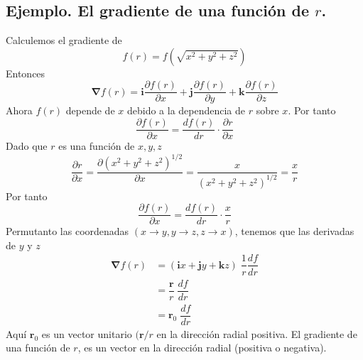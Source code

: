 \subsection*{Ejemplo. El gradiente de una función de $r$.}
Calculemos el gradiente de
\[ f(r) = f(\sqrt{x^{2} + y^{2} + z^{2}}) \]
Entonces
\[ \bm{\nabla} f(r) = \mathbf{i} \dfrac{\partial f(r)}{\partial x} + \mathbf{j} \dfrac{\partial f(r)}{\partial y} + \mathbf{k} \dfrac{\partial f(r)}{\partial z} \]
Ahora $f(r)$ depende de $x$ debido a la dependencia de $r$ sobre $x$. Por tanto
\[ \dfrac{\partial f(r)}{\partial x} = \dfrac{df(r)}{dr} \cdot \dfrac{\partial r}{\partial x} \]
Dado que $r$ es una función de $x,y,z$
\[ \dfrac{\partial r}{\partial x} = \dfrac{\partial (x^{2} + y^{2} + z^{2})^{1/2} }{\partial x} = \dfrac{x}{(x^{2} + y^{2} + z^{2})^{1/2}} = \dfrac{x}{r} \]
Por tanto
\[ \dfrac{\partial f(r)}{\partial x} = \dfrac{d f(r)}{d r} \cdot \dfrac{x}{r} \]
Permutanto las coordenadas $(x \to y, y \to z, z \to x)$, tenemos que las derivadas de $y$ y $z$
\[ \begin{split}  \bm{\nabla} f(r) &= ( \mathbf{i} x + \mathbf{j} y + \mathbf{k} z) \; \dfrac{1}{r} \dfrac{df}{dr} \\
&= \dfrac{\mathbf{r}}{r} \; \dfrac{df}{dr} \\
&= \mathbf{r}_{0} \; \dfrac{df}{dr} \end{split} \]
Aquí $\mathbf{r}_{0}$ es un vector unitario $(\mathbf{r}/r$ en la dirección radial positiva. El gradiente de una función de $r$, es un vector en la dirección radial (positiva o negativa).
